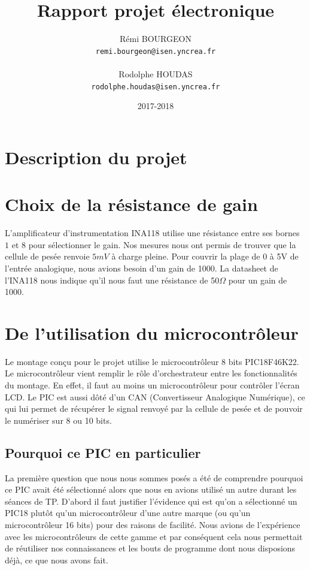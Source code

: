 \documentclass[a4paper,11pt,titlepage]{article}
\title{Rapport projet électronique}
\author{Rémi BOURGEON\\
\texttt{remi.bourgeon@isen.yncrea.fr}\\\\
Rodolphe HOUDAS\\
\texttt{rodolphe.houdas@isen.yncrea.fr}}
\date{2017-2018}
\begin{document}
\maketitle
\tableofcontents
\newpage


\section{Description du projet}

\section{Choix de la résistance de gain}

L'amplificateur d'instrumentation INA118 utilise une résistance entre ses bornes $1$ et $8$ pour sélectionner le gain. Nos mesures nous ont permis de trouver que la cellule de pesée renvoie $5mV$ à charge pleine. Pour couvrir la plage de 0 à 5V de l'entrée analogique, nous avions besoin d'un gain de 1000. La datasheet de l'INA118 nous indique qu'il nous faut une résistance de 50$\Omega$ pour un gain de 1000.

\section{De l'utilisation du microcontrôleur}
Le montage conçu pour le projet utilise le microcontrôleur 8 bits PIC18F46K22.
Le microcontrôleur vient remplir le rôle d'orchestrateur entre les fonctionnalités du montage. En effet, il faut au moins un microcontrôleur pour contrôler l'écran LCD. Le PIC est aussi dôté d'un CAN (Convertisseur Analogique Numérique), ce qui lui permet de récupérer le signal renvoyé par la cellule de pesée et de pouvoir le numériser sur 8 ou 10 bits.
\subsection{Pourquoi ce PIC en particulier}
La première question que nous nous sommes posés a été de comprendre pourquoi ce PIC avait été sélectionné alors que nous en avions utilisé un autre durant les séances de TP.
D'abord il faut justifier l'évidence qui est qu'on a sélectionné un PIC18 plutôt qu'un microcontrôleur d'une autre marque (ou qu'un microcontrôleur 16 bits) pour des raisons de facilité. Nous avions de l'expérience avec les microcontrôleurs de cette gamme et par conséquent cela nous permettait de réutiliser nos connaissances et les bouts de programme dont nous disposions déjà, ce que nous avons fait.
\end{document}
